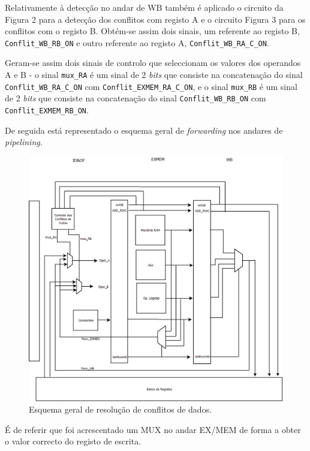 \documentclass[11pt]{article}
\numberwithin{equation}{section}
\begin{document}
Relativamente à detecção no andar de WB também é aplicado o circuito da Figura 2 para a detecção dos conflitos com registo A e o circuito Figura 3 para os conflitos com o registo B. Obtém-se assim dois sinais, um referente ao registo B, \texttt{Conflit\_WB\_RB\_ON} e outro referente ao registo A, \texttt{Conflit\_WB\_RA\_C\_ON}.

Geram-se assim dois sinais de controlo que seleccionam os valores dos operandos A e B - o sinal \texttt{mux\_RA} é um sinal de 2 \textit{bits} que consiste na concatenação do sinal \texttt{Conflit\_WB\_RA\_C\_ON} com \texttt{Conflit\_EXMEM\_RA\_C\_ON}, e o sinal \texttt{mux\_RB} é um sinal de 2 \textit{bits} que consiste na concatenação do sinal \texttt{Conflit\_WB\_RB\_ON} com \texttt{Conflit\_EXMEM\_RB\_ON}.

De seguida está representado o esquema geral de \textit{forwarding} nos andares de \textit{pipelining}.

\begin{figure}[H]
	\centering
	\includegraphics[keepaspectratio=true, scale=0.27]{imagens/DetecaodeconflitoGeral}
	\vspace{-0.5em}
	\caption{Esquema geral de resolução de conflitos de dados.}
	\vspace{-0.8em}
\end{figure} 

É de referir que foi acrescentado um MUX no andar EX/MEM de forma a obter o valor correcto do registo de escrita.
\end{document}
